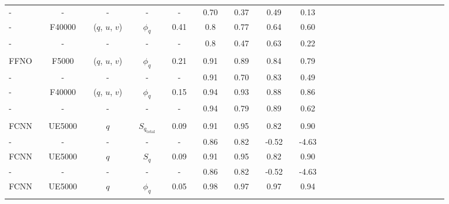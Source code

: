\begin{table}[H]
\begin{tabular}{llclclclclclclclclclclclclclclcl}
-     		&  & -               &  & -				   &  & -        &  & -              &  & 0.70           &  & 0.37           &  & 0.49             &  & 0.13         \\  
-           &  & F40000          &  & ($q$, $u$, $v$)  &  & $\phi_q$ &  & 0.41          &  & 0.8            &  & 0.77           &  & 0.64          &  & 0.60          \\ \rowcolor{Gray}
-     		&  & -               &  & -				   &  & -        &  & -              &  & 0.8            &  & 0.47           &  & 0.63          &  & 0.22             \\  
\hline \\[-1.4em]
FFNO        &  & F5000           &  & ($q$, $u$, $v$)  &  & $\phi_q$ &  & 0.21          &  & 0.91           &  & 0.89           &  & 0.84             &  & 0.79         \\ \rowcolor{Gray}
-     		&  & -               &  & -				   &  & -        &  & -              &  & 0.91           &  & 0.70           &  & 0.83             &  & 0.49         \\  
-           &  & F40000          &  & ($q$, $u$, $v$)  &  & $\phi_q$ &  & 0.15          &  & 0.94           &  & 0.93           &  & 0.88          &  & 0.86          \\ \rowcolor{Gray}
-     		&  & -               &  & -				   &  & -        &  & -              &  & 0.94           &  & 0.79           &  & 0.89          &  & 0.62          \\  [0.2em]
\hline \\[-1.4em]
FCNN      &  & UE5000      &  & $q$       &   & $S_{q_{\text{total}}}$     &  & 0.09      &  & 0.91       &  & 0.95     &  & 0.82      &  & 0.90         \\ \rowcolor{Blue}
-     		&  & -                  &  & -            &   & -                                       &  &  -           &  & 0.86      &  & 0.82     &  & -0.52     &  & -4.63        \\ 
FCNN      &  & UE5000      &  & $q$       &   & $S_q$                               &  & 0.09      &  & 0.91       &  & 0.95     &  & 0.82      &  & 0.90             \\ \rowcolor{Blue}
-     		&  & -                  &  & -            &   & -                                       &  &  -           &  & 0.86      &  & 0.82      &  & -0.52    &  & -4.63          \\ 
FCNN      &  & UE5000      &  & $q$       &   & $\phi_q $                          &  & 0.05      &  & 0.98      &  & 0.97      &  & 0.97      &  & 0.94             \\ \rowcolor{Blue}

\end{tabular}
\end{table}
